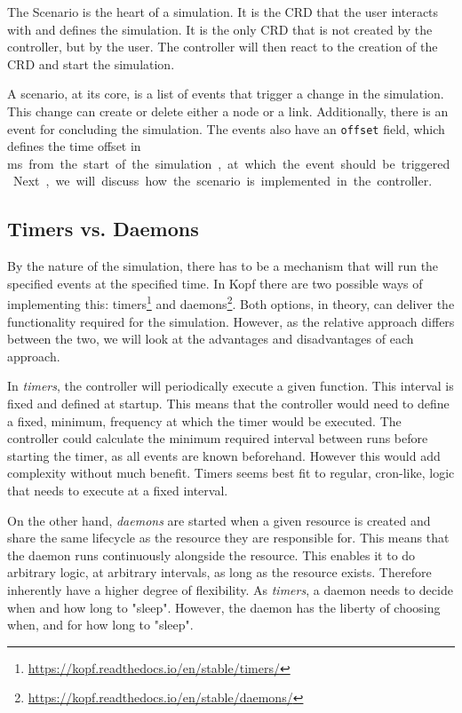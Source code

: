 The Scenario is the heart of a simulation. It is the CRD that the user interacts with and defines the simulation. It is the only CRD that is not created by the controller, but by the user. The controller will then react to the creation of the CRD and start the simulation.

A scenario, at its core, is a list of events that trigger a change in the simulation. This change can create or delete either a node or a link. Additionally, there is an event for concluding the simulation. The events also have an \verb|offset| field, which defines the time offset in \si\ms from the start of the simulation, at which the event should be triggered.

Next, we will discuss how the scenario is implemented in the controller.

\subsection{Timers vs. Daemons}

By the nature of the simulation, there has to be a mechanism that will run the specified events at the specified time. In Kopf there are two possible ways of implementing this: timers\footnote{\url{https://kopf.readthedocs.io/en/stable/timers/}} and daemons\footnote{\url{https://kopf.readthedocs.io/en/stable/daemons/}}. Both options, in theory, can deliver the functionality required for the simulation. However, as the relative approach differs between the two, we will look at the advantages and disadvantages of each approach.

In \textit{timers}, the controller will periodically execute a given function. This interval is fixed and defined at startup. This means that the controller would need to define a fixed, minimum, frequency at which the timer would be executed. The controller could calculate the minimum required interval between runs before starting the timer, as all events are known beforehand. However this would add complexity without much benefit. Timers seems best fit to regular, cron-like, logic that needs to execute at a fixed interval.

On the other hand, \textit{daemons} are started when a given resource is created and share the same lifecycle as the resource they are responsible for. This means that the daemon runs continuously alongside the resource. This enables it to do arbitrary logic, at arbitrary intervals, as long as the resource exists. Therefore inherently have a higher degree of flexibility. As \textit{timers}, a daemon needs to decide when and how long to "sleep". However, the daemon has the liberty of choosing when, and for how long to "sleep".

